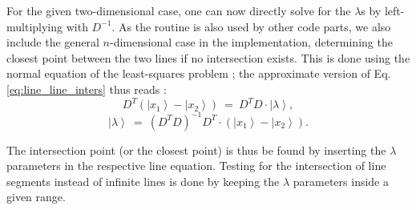 For the given two-dimensional case, one can now directly solve for the $\lambda$s by left-multiplying with $D^{-1}$.
As the routine is also used by other code parts, we also include the general $n$-dimensional case in the implementation, 
determining the closest point between the two lines if no intersection exists.
This is done using the normal equation of the least-squares problem \cite[p. 793]{Arens2015}; 
the approximate version of Eq. \ref{eq:line_line_inters} thus reads \cite{wiki_line_line_intersection}: 
\begin{equation}
	D^T \left(\left|x_1\right> - \left|x_2\right>\right) \ =\  D^T D \cdot \left| \lambda \right>,
\end{equation}
\begin{equation}
	\left| \lambda \right> \ =\  \left( D^T D \right)^{-1} D^T \cdot \left( \left|x_1\right> - \left|x_2\right> \right).
\end{equation}

The intersection point (or the closest point) is thus be found by inserting the $\lambda$ parameters in the respective line equation. 
Testing for the intersection of line segments instead of infinite lines is done by keeping the $\lambda$ parameters inside a given range.

